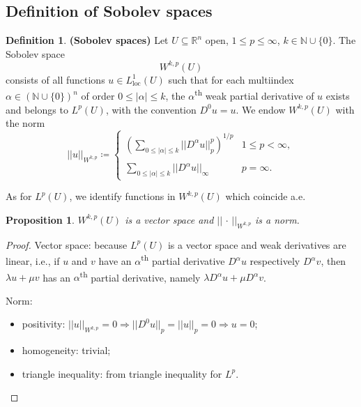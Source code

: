 \documentclass[12pt]{article}
\newtheorem{proposition}{Proposition}[section]
\theoremstyle{definition}
\newtheorem{definition}{Definition}[section]
\begin{document}
\subsection{Definition of Sobolev spaces}
\begin{definition}
\textbf{(Sobolev spaces)} Let $U\subseteq\mathbb{R}^n$ open, $1\leq p\leq\infty$, $k\in\mathbb{N}\cup\{0\}$. The Sobolev space
\[W^{k,p}(U)\]
consists of all functions $u\in L_{\text{loc}}^1(U)$ such that for each multiindex $\alpha\in(\mathbb{N}\cup\{0\})^n$ of order $0\leq|\alpha|\leq k$, the $\alpha$\textsuperscript{th} weak partial derivative of $u$ exists and belongs to $L^p(U)$, with the convention $D^0u=u$. We endow $W^{k,p}(U)$ with the norm
\[||u||_{W^{k,p}}\coloneqq\left\{\begin{array}{cc}\displaystyle{\left(\sum_{0\leq|\alpha|\leq k}||D^{\alpha}u||_p^p\right)^{1/p}}&1\leq p<\infty,\\\\\displaystyle{\sum_{0\leq|\alpha|\leq k}||D^{\alpha}u||_{\infty}}&p=\infty.\end{array}\right.\]

As for $L^p(U)$, we identify functions in $W^{k,p}(U)$ which coincide a.e.
\end{definition}

\begin{proposition}
$W^{k,p}(U)$ is a vector space and $||\,\cdot\,||_{W^{k,p}}$ is a norm.
\end{proposition}

\begin{proof}
Vector space: because $L^p(U)$ is a vector space and weak derivatives are linear, i.e., if $u$ and $v$ have an $\alpha$\textsuperscript{th} partial derivative $D^{\alpha}u$ respectively $D^{\alpha}v$, then $\lambda u+\mu v$ has an $\alpha$\textsuperscript{th} partial derivative, namely $\lambda D^{\alpha}u+\mu D^{\alpha}v$.

Norm:
\begin{itemize}
\item positivity: $||u||_{W^{k,p}}=0\Rightarrow||D^0u||_p=||u||_p=0\Rightarrow u=0$;
\item homogeneity: trivial;
\item triangle inequality: from triangle inequality for $L^p$.
\end{itemize}
\end{proof}
\end{document}
